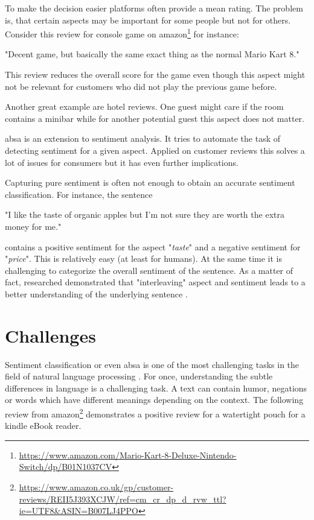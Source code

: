 To make the decision easier platforms often provide a mean rating. The problem is, that certain aspects may be important for some people but not for others. Consider this review for console game on amazon\footnote{\url{https://www.amazon.com/Mario-Kart-8-Deluxe-Nintendo-Switch/dp/B01N1037CV}} for instance:

\begin{center}
	"Decent game, but basically the same exact thing as the normal Mario Kart 8."
\end{center}

This review reduces the overall score for the game even though this aspect might not be relevant for customers who did not play the previous game before. 

Another great example are hotel reviews. One guest might care if the room contains a minibar while for another potential guest this aspect does not matter.
\bigskip

\acrfull{absa} is an extension to sentiment analysis. It tries to automate the task of detecting sentiment for a given aspect. Applied on customer reviews this solves a lot of issues for consumers but it has even further implications.
\medskip

Capturing pure sentiment is often not enough to obtain an accurate sentiment classification. For instance, the sentence

\begin{center}
	"I like the taste of organic apples but I'm not sure they are worth the extra money for me."
\end{center}

contains a positive sentiment for the aspect "\textit{taste}" and a negative sentiment for "\textit{price}". This is relatively easy {(at least for humans)}. At the same time it is challenging to categorize the overall sentiment of the sentence. As a matter of fact, researched demonstrated that "interleaving" aspect and sentiment leads to a better understanding of the underlying sentence \cite{Lakkaraju2014}.


\section{Challenges}

Sentiment classification or even \acrfull{absa} is one of the most challenging tasks in the field of natural language processing \cite{Pang2012}. For once, understanding the subtle differences in language is a challenging task. A text can contain humor, negations or words which have different meanings depending on the context. The following review from amazon\footnote{\url{https://www.amazon.co.uk/gp/customer-reviews/REII5J393XCJW/ref=cm_cr_dp_d_rvw_ttl?ie=UTF8&ASIN=B007LJ4PPO}} demonstrates a positive review for a watertight pouch for a kindle eBook reader.

